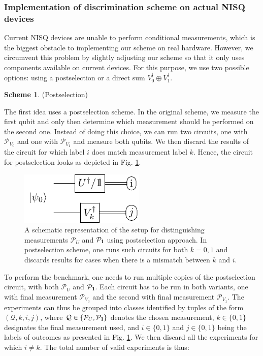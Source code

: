 \documentclass[preprint,12pt, a4paper, dvipsnames]{elsarticle}
\newcommand{\1}{{\rm 1\hspace{-0.9mm}l}}
\newcommand{\Id}{{\rm 1\hspace{-0.9mm}l}}
\newcommand{\PP}{\mathcal{P}}
\theoremstyle{definition}
\newtheorem{scheme}{Scheme}
\begin{document}
\subsubsection{Implementation of discrimination scheme on actual NISQ devices}

Current NISQ devices are unable to perform conditional measurements, which is the biggest
obstacle to implementing our scheme on real hardware. However, we circumvent this problem by
slightly adjusting our scheme so that it only uses components available on current devices.
For this purpose, we use two possible options: using a postselection or a direct sum $V_0^\dagger\oplus V_1^\dagger$.

\begin{scheme}(Postselection)

	The first idea uses a postselection scheme. In the original scheme, we measure the first qubit
	and only then determine which measurement should be performed on the second one. Instead of
	doing this choice, we can run two circuits, one with $\PP_{V_0}$ and one with $\PP_{V_1}$ and
	measure both qubits. We then discard the results of the circuit for which label $i$ does match
	measurement label $k$. Hence, the circuit for postselection looks as depicted in Fig.
	\ref{fig:postselection}.

	\begin{figure}[h!]
		\centering
		\includegraphics[scale=1.7]{pics/postselection_no_channels}

		\caption{
			A schematic representation of the setup for distinguishing
			measurements $\PP_{U}$ and $\PP_{\Id}$ using postselection approach.
			In postselection scheme, one runs such circuits for both $k=0,1$ and discards results for cases when there is a mismatch between $k$ and $i$.
		}\label{fig:postselection}
	\end{figure}


	To perform the benchmark, one needs to run multiple copies of the postselection circuit,
	with both $\PP_U$ and $\PP_\1$. Each circuit has to be run in both variants, one with final
	measurement $\PP_{V_0}$ and the second with final measurement $\PP_{V_1}$.
	The experiments can thus be grouped into classes identified by tuples of the form
	$(\mathcal{Q}, k, i, j)$, where $\mathcal{Q} \in \{\PP_U, \PP_\Id\}$ denotes the chosen
	measurement, $k \in \{0,1\}$ designates the final measurement used, and $i \in \{0,1\}$ and $j
	\in \{0,1\}$ being the labels of outcomes as presented in Fig. \ref{fig:postselection}.
	We then discard all the experiments for which $i \ne k$. The total number of valid experiments
	is thus:


\end{scheme}
\end{document}

